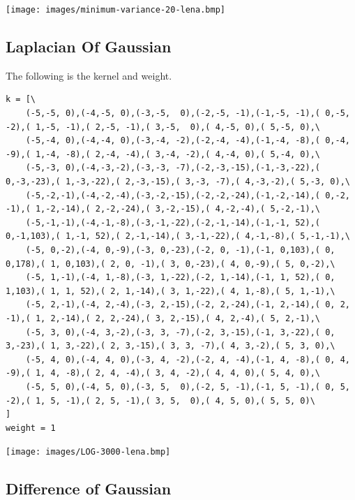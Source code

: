 \documentclass[10pt,a4paper]{article}
\newenvironment{Figure}
  {\par\medskip\noindent\minipage{\linewidth}}
  {\endminipage\par\medskip}
\begin{document}
\begin{multicols}{2}
\begin{Figure}
\centering
\texttt{[image: images/minimum-variance-20-lena.bmp]}
\label{fig:minimum-variance-20-lena.bmp}
\end{Figure}

\subsection{Laplacian Of Gaussian}

The following is the kernel and weight.

\begin{lstlisting}
k = [\
	(-5,-5, 0),(-4,-5, 0),(-3,-5,  0),(-2,-5, -1),(-1,-5, -1),( 0,-5, -2),( 1,-5, -1),( 2,-5, -1),( 3,-5,  0),( 4,-5, 0),( 5,-5, 0),\
	(-5,-4, 0),(-4,-4, 0),(-3,-4, -2),(-2,-4, -4),(-1,-4, -8),( 0,-4, -9),( 1,-4, -8),( 2,-4, -4),( 3,-4, -2),( 4,-4, 0),( 5,-4, 0),\
	(-5,-3, 0),(-4,-3,-2),(-3,-3, -7),(-2,-3,-15),(-1,-3,-22),( 0,-3,-23),( 1,-3,-22),( 2,-3,-15),( 3,-3, -7),( 4,-3,-2),( 5,-3, 0),\
	(-5,-2,-1),(-4,-2,-4),(-3,-2,-15),(-2,-2,-24),(-1,-2,-14),( 0,-2, -1),( 1,-2,-14),( 2,-2,-24),( 3,-2,-15),( 4,-2,-4),( 5,-2,-1),\
	(-5,-1,-1),(-4,-1,-8),(-3,-1,-22),(-2,-1,-14),(-1,-1, 52),( 0,-1,103),( 1,-1, 52),( 2,-1,-14),( 3,-1,-22),( 4,-1,-8),( 5,-1,-1),\
	(-5, 0,-2),(-4, 0,-9),(-3, 0,-23),(-2, 0, -1),(-1, 0,103),( 0, 0,178),( 1, 0,103),( 2, 0, -1),( 3, 0,-23),( 4, 0,-9),( 5, 0,-2),\
	(-5, 1,-1),(-4, 1,-8),(-3, 1,-22),(-2, 1,-14),(-1, 1, 52),( 0, 1,103),( 1, 1, 52),( 2, 1,-14),( 3, 1,-22),( 4, 1,-8),( 5, 1,-1),\
	(-5, 2,-1),(-4, 2,-4),(-3, 2,-15),(-2, 2,-24),(-1, 2,-14),( 0, 2, -1),( 1, 2,-14),( 2, 2,-24),( 3, 2,-15),( 4, 2,-4),( 5, 2,-1),\
	(-5, 3, 0),(-4, 3,-2),(-3, 3, -7),(-2, 3,-15),(-1, 3,-22),( 0, 3,-23),( 1, 3,-22),( 2, 3,-15),( 3, 3, -7),( 4, 3,-2),( 5, 3, 0),\
	(-5, 4, 0),(-4, 4, 0),(-3, 4, -2),(-2, 4, -4),(-1, 4, -8),( 0, 4, -9),( 1, 4, -8),( 2, 4, -4),( 3, 4, -2),( 4, 4, 0),( 5, 4, 0),\
	(-5, 5, 0),(-4, 5, 0),(-3, 5,  0),(-2, 5, -1),(-1, 5, -1),( 0, 5, -2),( 1, 5, -1),( 2, 5, -1),( 3, 5,  0),( 4, 5, 0),( 5, 5, 0)\
]
weight = 1
\end{lstlisting}

\begin{Figure}
\centering
\texttt{[image: images/LOG-3000-lena.bmp]}
\captionof{figure}{LOG with threshold = 3000}
\label{fig:LOG-3000-lena.bmp}
\end{Figure}

\subsection{Difference of Gaussian}


\end{multicols}
\end{document}
